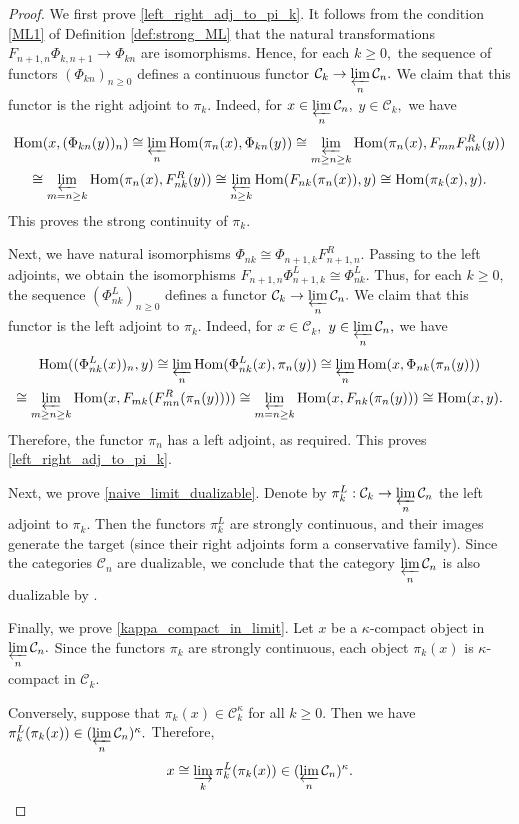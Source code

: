 \documentclass[11pt,leqno]{amsart}
\numberwithin{equation}{section}
\def\Hom{\operatorname{Hom}}
\newcommand{\indlim}[1][]{\mathop{\varinjlim}\limits_{#1}}
\newcommand{\prolim}[1][]{\mathop{\varprojlim}\limits_{#1}}
\newcommand{\cC}{{\mathcal C}}
\begin{document}
\begin{proof}We first prove \ref{left_right_adj_to_pi_k}. 
It follows from the condition \ref{ML1} of Definition \ref{def:strong_ML} that the natural transformations $F_{n+1,n}\Phi_{k,n+1}\to\Phi_{kn}$ are isomorphisms. Hence, for each $k\geq 0,$ the sequence of functors $(\Phi_{kn})_{n\geq 0}$ defines a continuous functor $\cC_k\to \prolim[n]\cC_n.$ We claim that this functor is the right adjoint to $\pi_k.$ Indeed, for $x\in\prolim[n]\cC_n,$ $y\in\cC_k,$ we have
\begin{multline*}\Hom(x,(\Phi_{kn}(y))_n)\cong \prolim[n]\Hom(\pi_n(x),\Phi_{kn}(y))\cong \prolim[m\geq n\geq k]\Hom(\pi_n(x),F_{mn}F_{mk}^R(y))\\
	\cong \prolim[m=n\geq k]\Hom(\pi_n(x),F_{nk}^R(y))\cong\prolim[n\geq k]\Hom(F_{nk}(\pi_n(x)),y)\cong \Hom(\pi_k(x),y).
\end{multline*}
This proves the strong continuity of $\pi_k.$

Next, we have natural isomorphisms $\Phi_{nk}\cong \Phi_{n+1,k}F_{n+1,n}^R.$ Passing to the left adjoints, we obtain the isomorphisms $F_{n+1,n}\Phi_{n+1,k}^L\cong \Phi_{nk}^L.$ Thus, for each $k\geq 0,$ the sequence $(\Phi_{nk}^L)_{n\geq 0}$ defines a functor $\cC_k\to \prolim[n]\cC_n.$ We claim that this functor is the left adjoint to $\pi_k.$ Indeed, for $x\in\cC_k,$ $y\in\prolim[n]\cC_n,$ we have
\begin{multline*}
\Hom((\Phi_{nk}^L(x))_n,y)\cong\prolim[n]\Hom(\Phi_{nk}^L(x),\pi_n(y))\cong\prolim[n]\Hom(x,\Phi_{nk}(\pi_n(y)))\\
\cong\prolim[m\geq n\geq k]\Hom(x,F_{mk}(F_{mn}^R(\pi_n(y)))) \cong \prolim[m=n\geq k]\Hom(x,F_{nk}(\pi_n(y)))\cong\Hom(x,y). 
\end{multline*}
Therefore, the functor $\pi_n$ has a left adjoint, as required. This proves \ref{left_right_adj_to_pi_k}.

Next, we prove \ref{naive_limit_dualizable}. Denote by $\pi_k^L:\cC_k\to\prolim[n]\cC_n$ the left adjoint to $\pi_k.$ Then the functors $\pi_k^L$ are strongly continuous, and their images generate the target (since their right adjoints form a conservative family). Since the categories $\cC_n$ are dualizable, we conclude that the category $\prolim[n]\cC_n$ is also dualizable by \cite[Proposition 1.55]{E24}.

Finally, we prove \ref{kappa_compact_in_limit}. Let $x$ be a $\kappa$-compact object in $\prolim[n]\cC_n.$ Since the functors $\pi_k$ are strongly continuous, each object $\pi_k(x)$ is $\kappa$-compact in $\cC_k.$

Conversely, suppose that $\pi_k(x)\in\cC_k^{\kappa}$ for all $k\geq 0.$ Then we have $\pi_k^L(\pi_k(x))\in (\prolim[n]\cC_n)^{\kappa}.$ Therefore,
\begin{equation*}x\cong \indlim[k]\pi_k^L(\pi_k(x))\in (\prolim[n]\cC_n)^{\kappa}.\qedhere\end{equation*}\end{proof}
\end{document}
